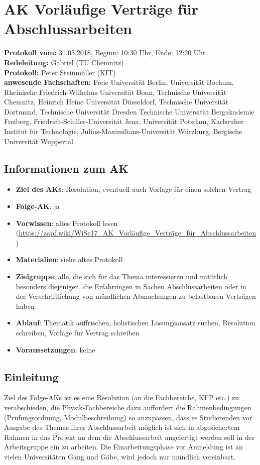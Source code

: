 
\section{AK Vorläufige Verträge für Abschlussarbeiten}

	\textbf{Protokoll vom:} 31.05.2018,
	Beginn: 10:30 Uhr,
	Ende: 12:20 Uhr \\
	\textbf{Redeleitung:} Gabriel (TU Chemnitz) \\
	\textbf{Protokoll:} Peter Steinmüller (KIT) \\
	\textbf{anwesende Fachschaften:} Freie Universität Berlin, Universität Bochum, Rheinische Friedrich-Wilhelms-Universität Bonn, Technische Universität Chemnitz, Heinrich Heine Universität Düsseldorf, Technische Universität Dortmund, Technische Universität Dresden Technische Universität Bergakademie Freiberg, Friedrich-Schiller-Universität Jena, Universität Potsdam, Karlsruher Institut für Technologie, Julius-Maximilians-Universität Würzburg, Bergische Universität Wuppertal

	\subsection*{Informationen zum AK}
		\begin{itemize}
			\item \textbf{Ziel des AKs}: Resolution, eventuell auch Vorlage für einen solchen Vertrag
			\item \textbf{Folge-AK}: ja
			\item \textbf{Vorwissen}: altes Protokoll lesen (\url{https://zapf.wiki/WiSe17_AK_Vorläufige_Verträge_für_Abschlussarbeiten})
      \item \textbf{Materialien}: siehe altes Protokoll
			\item \textbf{Zielgruppe}: alle, die sich für das Thema interessieren und natürlich besonders diejenigen, die Erfahrungen in Sachen Abschlussarbeiten oder in der Verschriftlichung von mündlichen Abmachungen zu belastbaren Verträgen haben
			\item \textbf{Ablauf}: Thematik auffrischen, holistischen Lösungsansatz suchen, Resolution schreiben, Vorlage für Vertrag schreiben
			\item \textbf{Voraussetzungen}: keine
		\end{itemize}

  \subsection{Einleitung}
  	Ziel des Folge-AKs ist es eine Resolution (an die Fachbereiche, KFP etc.) zu verabschieden, die Physik-Fachbereiche dazu auffordert die Rahmenbedingungen (Prüfungsordnung, Modulbeschreibung) so anzupassen, dass es Studierenden vor Ausgabe des Themas ihrer Abschlussarbeit möglich ist sich in abgesichertem Rahmen in das Projekt an dem die Abschlussarbeit angefertigt werden soll in der Arbeitsgruppe ein zu arbeiten. Die Einarbeitungsphase vor Anmeldung ist an vielen Universitäten Gang und Gäbe, wird jedoch nur mündlich vereinbart.

